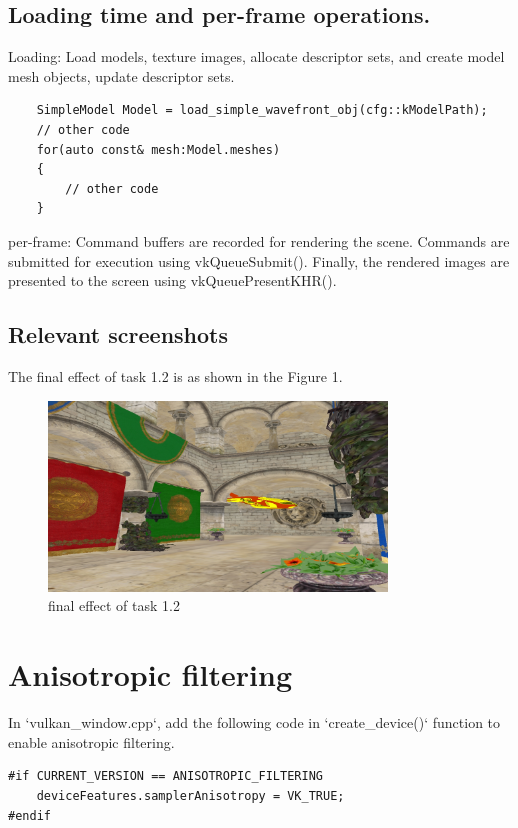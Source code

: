 \documentclass[10pt]{article}
\begin{document}
\subsection{Loading time and per-frame operations.}

\noindent Loading: Load models, texture images, allocate descriptor sets, and create model mesh objects, update descriptor sets.

\begin{lstlisting}
    SimpleModel Model = load_simple_wavefront_obj(cfg::kModelPath);
    // other code
    for(auto const& mesh:Model.meshes)
    {
        // other code
    }
\end{lstlisting}

\noindent per-frame: Command buffers are recorded for rendering the scene.
Commands are submitted for execution using vkQueueSubmit().
Finally, the rendered images are presented to the screen using vkQueuePresentKHR().

\subsection{Relevant screenshots}

\noindent The final effect of task 1.2 is as shown in the Figure 1.

\begin{figure}[htbp]
    \centering
    \includegraphics[width=9cm]{1.2.png}
    \caption{final effect of task 1.2}
\end{figure}

\section{Anisotropic filtering}

\noindent In `vulkan\_window.cpp`, add the following code in `create\_device()` function to enable anisotropic filtering.

\begin{lstlisting}
#if CURRENT_VERSION == ANISOTROPIC_FILTERING
    deviceFeatures.samplerAnisotropy = VK_TRUE;
#endif
\end{lstlisting}
\end{document}
